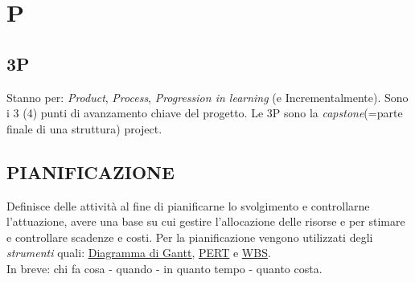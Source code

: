 \newpage
	\flushright{\hyperref[index]{\color{black!65}{Ritorna all'indice}}}\flushleft
	\section{P} \label{sec:P}
	
		\subsection{3P}		\label{3p}
		Stanno per: \textit{Product}, \textit{Process}, \textit{Progression in learning} (e Incrementalmente). Sono i 3 (4) punti di avanzamento chiave del progetto. Le 3P sono la \textit{capstone}(=parte finale di una struttura) project.
		
		\subsection{PIANIFICAZIONE}  \label{pianificazione}
		Definisce delle attività al fine di pianificarne lo svolgimento e controllarne l’attuazione, avere una base su cui gestire l’allocazione delle risorse e per stimare e controllare scadenze e costi. Per la pianificazione vengono utilizzati degli \textit{strumenti} quali: \underline{\hyperref[gantt]{Diagramma di Gantt}}, \underline{\hyperref[pert]{PERT}} e \underline{\hyperref[wbs]{WBS}}. \\		
		In breve: chi fa cosa - quando - in quanto tempo - quanto costa. 
	
